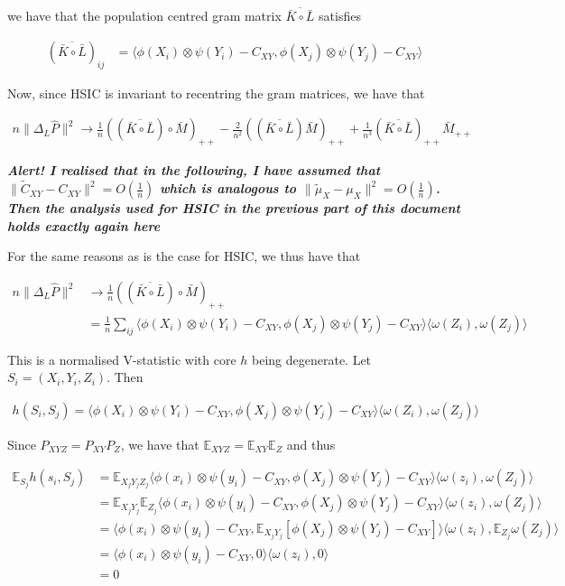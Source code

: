 \documentclass{article}
\begin{document}
we have that the population centred gram matrix $\overline{\bar{K}\circ\bar{L}}$ satisfies

\begin{align*}
(\overline{\bar{K}\circ\bar{L}})_{ij} &= 
\langle\phi(X_i)\otimes \psi(Y_i) - C_{XY}, \phi(X_j)\otimes\psi(Y_j)  - C_{XY}\rangle
\end{align*}

Now, since HSIC is invariant to recentring the gram matrices, we have that

\begin{align*}
n\|\Delta_L \hat{P}\|^2 \longrightarrow \frac{1}{n}((\overline{\bar{K}\circ \bar{L}}) \circ \bar{M})_{++} - \frac{2}{n^2}((\overline{\bar{K}\circ \bar{L}})\bar{M})_{++} + \frac{1}{n^3}(\overline{\bar{K}\circ \bar{L}})_{++}\bar{M}_{++}
\end{align*}

\begin{center}
\emph{\textbf{Alert! I realised that in the following, I have assumed that $\|\tilde{C}_{XY} - C_{XY}\|^2 = O(\frac{1}{n})$ which is analogous to $\|\tilde{\mu}_{X} - \mu_{X}\|^2 = O(\frac{1}{n})$. Then the analysis used for HSIC in the previous part of this document holds exactly again here}}
\end{center}

For the same reasons as is the case for HSIC, we thus have that

\begin{align*}
n\|\Delta_L \hat{P}\|^2 &\longrightarrow \frac{1}{n}((\overline{\bar{K}\circ \bar{L}}) \circ \bar{M})_{++}\\&=
\frac{1}{n} \sum_{ij} \langle\phi(X_i)\otimes \psi(Y_i) - C_{XY}, \phi(X_j)\otimes \psi(Y_j) - C_{XY}\rangle \langle \omega(Z_i),\omega(Z_j) \rangle
\end{align*}

This is a normalised V-statistic with core $h$ being degenerate. Let $S_i = (X_i,Y_i,Z_i)$. Then

\begin{align*}
h(S_i,S_j) = \langle\phi(X_i)\otimes \psi(Y_i) - C_{XY}, \phi(X_j)\otimes \psi(Y_j) - C_{XY}\rangle \langle \omega(Z_i),\omega(Z_j) \rangle
\end{align*}

Since $P_{XYZ} = P_{XY} P_Z$, we have that $\mathbb{E}_{XYZ}=\mathbb{E}_{XY}\mathbb{E}_{Z}$ and thus

\begin{align*}
\mathbb{E}_{S_j}h(s_i,S_j) &= \mathbb{E}_{X_jY_jZ_j}\langle\phi(x_i)\otimes \psi(y_i) - C_{XY}, \phi(X_j)\otimes \psi(Y_j) - C_{XY}\rangle \langle \omega(z_i),\omega(Z_j) \rangle \\&=
\mathbb{E}_{X_jY_j}\mathbb{E}_{Z_j}\langle\phi(x_i)\otimes \psi(y_i) - C_{XY}, \phi(X_j)\otimes \psi(Y_j) - C_{XY}\rangle \langle \omega(z_i),\omega(Z_j) \rangle \\&=
\langle\phi(x_i)\otimes \psi(y_i) - C_{XY},\mathbb{E}_{X_jY_j}[ \phi(X_j)\otimes \psi(Y_j) - C_{XY}]\rangle \langle \omega(z_i),\mathbb{E}_{Z_j}\omega(Z_j) \rangle \\&=
\langle\phi(x_i)\otimes \psi(y_i) - C_{XY},0\rangle \langle \omega(z_i),0 \rangle \\&= 0
\end{align*}
\end{document}
